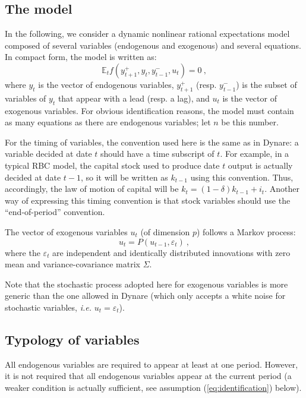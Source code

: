 \documentclass[11pt,a4paper]{article}
\begin{document}
\subsection{The model}

In the following, we consider a dynamic nonlinear rational expectations model
composed of several variables (endogenous and exogenous) and several
equations. In compact form, the model is written as:
\begin{equation}
  \label{eq:model}
  \mathbb{E}_t f(y^+_{t+1}, y_t, y^-_{t-1}, u_t) = 0 \: ,
\end{equation}
where $y_t$ is the vector of endogenous variables, $y^+_{t+1}$
(resp. $y^-_{t-1}$) is the subset of variables of $y_t$ that appear with a lead
(resp. a lag), and $u_t$ is the vector of exogenous variables. For obvious
identification reasons, the model must contain as many equations as there are
endogenous variables; let $n$ be this number.

For the timing of variables, the convention used here is the same as in Dynare:
a variable decided at date $t$ should have a time subscript of $t$. For
example, in a typical RBC model, the capital stock used to produce date $t$
output is actually decided at date $t-1$, so it will be written as $k_{t-1}$
using this convention. Thus, accordingly, the law of motion of capital will be
$k_t = (1-\delta)k_{t-1} + i_t$. Another way of expressing this timing
convention is that stock variables should use the ``end-of-period'' convention.

The vector of exogenous variables $u_t$ (of dimension $p$) follows a Markov
process:
\begin{equation*}
  u_t = P(u_{t-1}, \varepsilon_t) \: ,
\end{equation*}
where the $\varepsilon_t$ are independent and identically distributed
innovations with zero mean and variance-covariance matrix $\Sigma$.

Note that the stochastic process adopted here for exogenous variables is more
generic than the one allowed in Dynare (which only accepts a white noise for
stochastic variables, \textit{i.e.} $u_t = \varepsilon_t$).

\subsection{Typology of variables}

All endogenous variables are required to appear at least at one period. However,
it is not required that all endogenous variables appear at the current period
(a weaker condition is actually sufficient, see assumption
(\ref{eq:identification}) below).
\end{document}
